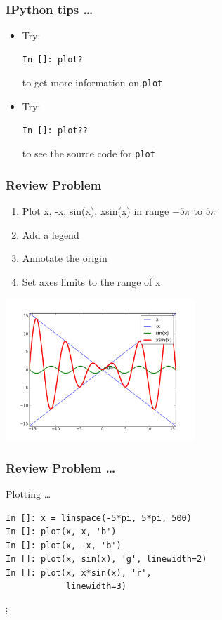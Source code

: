 \documentclass[14pt,compress]{beamer}
\newcommand{\typ}[1]{\lstinline{#1}}
\begin{document}
\begin{frame}[fragile]
\frametitle{IPython tips \ldots}

\begin{itemize}

    \item Try:
\begin{lstlisting}
In []: plot?
\end{lstlisting}
        to get more information on \typ{plot} 

        \vspace*{0.5in}
    \item Try: 
\begin{lstlisting}
In []: plot??
\end{lstlisting}
    to see the source code for \typ{plot}

\end{itemize}

\end{frame}


\begin{frame}[fragile]
\frametitle{Review Problem}
\begin{enumerate}
\item Plot x, -x, sin(x), xsin(x) in range $-5\pi$ to $5\pi$
\item Add a legend
\item Annotate the origin
\item Set axes limits to the range of x
\end{enumerate}
\vspace*{-0.1in}
\begin{center}
  \includegraphics[height=2.1in, interpolate=true]{data/four_plot}  
\end{center}
\end{frame}

\begin{frame}[fragile]
\frametitle{Review Problem \ldots}
\alert{Plotting \ldots}
\begin{lstlisting}
In []: x = linspace(-5*pi, 5*pi, 500)
In []: plot(x, x, 'b')
In []: plot(x, -x, 'b')
In []: plot(x, sin(x), 'g', linewidth=2)
In []: plot(x, x*sin(x), 'r', 
            linewidth=3)
\end{lstlisting}
$\vdots$
\end{frame}
\end{document}
